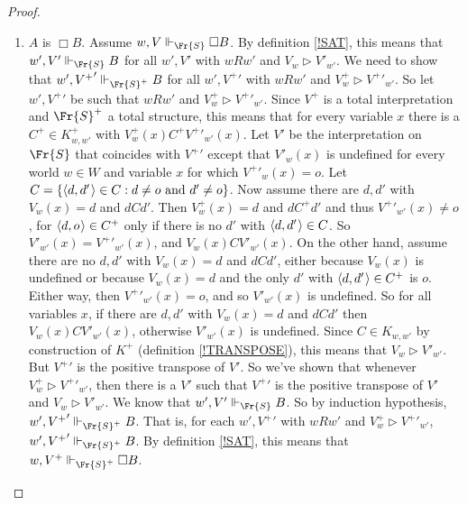 \documentclass[11pt]{woarticle}
\theoremstyle{break}
\theoremstyle{nonumberplain}
\newcommand{\SAT}{\Vdash}
\newcommand{\Img}{\triangleright}
\newcommand{\1}{\;\,|\;\,}
\renewcommand{\t}[1]{\ensuremath{\langle #1  \makebox[.2ex]{}\rangle}}
\begin{document}
\begin{proof}
\begin{enumerate}
  \item $A$ is $\Box B$.\; Assume $w,V \SAT_{\Fr{S}} \Box B$. By
    definition \ref{!SAT}, this means that $w',V' \SAT_{\Fr{S}} B$ for
    all $w',V'$ with $wRw'$ and $V_w\Img V'_{w'}$. We need to show
    that $w',{V^+}' \SAT_{\Fr{S}^+} B$ for all $w',{V^+}'$ with $wRw'$
    and $V^+_w\Img {V^+}'_{w'}$. So let $w',{V^+}'$ be such that
    $wRw'$ and $V^+_w \Img {V^+}'_{w'}$. Since $V^+$ is a total
    interpretation and $\Fr{S}^+$ a total structure, this means that
    for every variable $x$ there is a $C^+ \in K^+_{w,w'}$ with
    $V_w^+(x)C^+{V^+}'_{w'}(x)$. Let $V'$ be the interpretation on
    $\Fr{S}$ that coincides with ${V^+}'$ except that $V'_w(x)$ is
    undefined for every world $w\in W$ and variable $x$ for which
    ${V^+}'_w(x) = o$. Let $C = \{ \t{d,d'} \in C : d \not=o \text{
      and } d'\not=o \}$. Now assume there are $d,d'$ with $V_w(x)=d$
    and $dCd'$. Then $V^+_w(x) = d$ and $dC^+d'$ and thus
    ${V^+}'_{w'}(x) \not= o$, for $\t{d,o} \in C^+$ only if there is
    no $d'$ with $\t{d,d'} \in C$. So $V'_{w'}(x) = {V^+}'_{w'}(x)$,
    and $V_w(x)CV'_{w'}(x)$. On the other hand, assume there are no
    $d,d'$ with $V_w(x)=d$ and $dCd'$, either because $V_w(x)$ is
    undefined or because $V_w(x)=d$ and the only $d'$ with $\t{d,d'}
    \in C^+$ is $o$. Either way, then ${V^+}'_{w'}(x) = o$, and so
    $V'_{w'}(x)$ is undefined. So for all variables $x$, if there are
    $d,d'$ with $V_w(x)=d$ and $dCd'$ then $V_w(x)CV'_{w'}(x)$,
    otherwise $V'_{w'}(x)$ is undefined. Since $C \in K_{w,w'}$ by
    construction of $K^+$ (definition \ref{!TRANSPOSE}), this means
    that $V_w \Img V'_{w'}$. But ${V^+}'$ is the positive transpose of
    $V'$. So we've shown that whenever $V^+_w \Img {V^+}'_{w'}$, then
    there is a $V'$ such that ${V^+}'$ is the positive transpose of
    $V'$ and $V_w \Img V'_{w'}$. We know that $w',V' \SAT_{\Fr{S}}
    B$. So by induction hypothesis, $w',{V^+}' \SAT_{\Fr{S}^+}
    B$. That is, for each $w',{V^+}'$ with $wRw'$ and $V^+_w \Img
    {V^+}'_{w'}$, $w',{V^+}' \SAT_{\Fr{S}^+} B$. By definition
    \ref{!SAT}, this means that $w, V^+ \SAT_{\Fr{S}^+} \Box B$.


\end{enumerate}
\end{proof}
\end{document}
